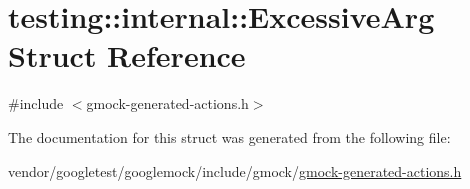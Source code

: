 \hypertarget{structtesting_1_1internal_1_1_excessive_arg}{}\section{testing\+:\+:internal\+:\+:Excessive\+Arg Struct Reference}
\label{structtesting_1_1internal_1_1_excessive_arg}


{\ttfamily \#include $<$gmock-\/generated-\/actions.\+h$>$}



The documentation for this struct was generated from the following file\+:\begin{DoxyCompactItemize}
\item 
vendor/googletest/googlemock/include/gmock/\hyperlink{gmock-generated-actions_8h}{gmock-\/generated-\/actions.\+h}\end{DoxyCompactItemize}
